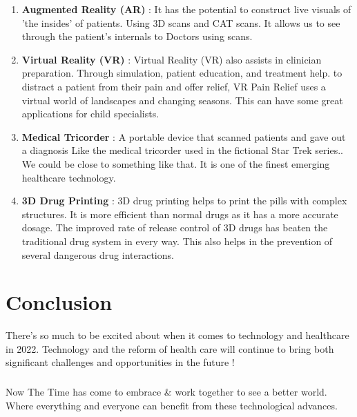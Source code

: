 \documentclass[12pt]{article}
\begin{document}
\begin{enumerate}
\item \textbf{Augmented Reality (AR)} : It has the potential to construct live visuals of 'the insides' of patients. Using 3D scans and CAT scans. It allows us to see through the patient's internals to Doctors using scans.

\item \textbf{Virtual Reality (VR)} : Virtual Reality (VR) also assists in clinician preparation. Through simulation, patient education, and treatment help. to distract a patient from their pain and offer relief, VR Pain Relief uses a virtual world of landscapes and changing seasons. This can have some great applications for child specialists.

\item \textbf{Medical Tricorder} : A portable device that scanned patients and gave out a diagnosis  Like the medical tricorder used in the fictional Star Trek series.. We could be close to something like that. It is one of the finest emerging healthcare technology.

\item \textbf{3D Drug Printing} : 3D drug printing helps to print the pills with complex structures. It is more efficient than normal drugs as it has a more accurate dosage. The improved rate of release control of 3D drugs has beaten the traditional drug system in every way. This also helps in the prevention of several dangerous drug interactions.

\end{enumerate}

\section{Conclusion}
There's so much to be excited about when it comes to technology and healthcare in 2022. Technology and the reform of health care will continue to bring both significant challenges  and opportunities in the future !\vspace{-5mm}
\subparagraph{ } Now The Time has come to embrace \& work together to see a better world. Where everything and everyone can benefit from these technological advances.
\end{document}
